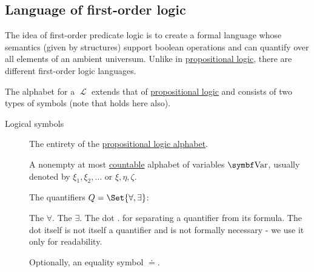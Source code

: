 \subsection{Language of first-order logic}\label{subsec:language_of_first_order_logic}

\begin{definition}\label{def:first_order_language}
  The idea of first-order predicate logic is to create a formal language whose semantics (given by structures) support boolean operations and can quantify over all elements of an ambient universum. Unlike in \hyperref[subsec:language_of_propositional_logic]{propositional logic}, there are different first-order logic languages.

  The alphabet for a  \( \mscrL \) extends that of \hyperref[subsec:language_of_propositional_logic]{propositional logic} and consists of two types of symbols (note that  holds here also).

  \begin{description}
    \item[Logical symbols]\mbox{}
    \begin{DefEnum}[series=def:first_order_language]
       The entirety of the \hyperref[subsec:language_of_propositional_logic]{propositional logic alphabet}.

       A nonempty at most \hyperref[rem:cardinals/countable]{countable} alphabet of variables \( \Bold{Var} \), usually denoted by \( \xi_1, \xi_2, \ldots \) or \( \xi, \eta, \zeta \).

       The quantifiers \( Q = \Set{ \forall, \exists } \):
      \begin{DefEnum}
         The  \( \forall \).
         The  \( \exists \).
         The dot \( . \) for separating a quantifier from its formula. The dot itself is not itself a quantifier and is not formally necessary - we use it only for readability.
      \end{DefEnum}

       Optionally, an equality symbol \( \doteq \).
    \end{DefEnum}


\end{description}
\end{definition}
